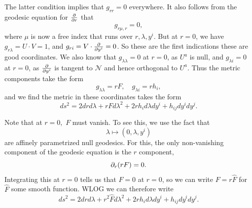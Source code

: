 The latter condition implies that $g_{rr}=0$ everywhere. It also follows from the geodesic equation for $\P{}{r}$ that
\begin{equation}
    g_{r\mu,r}=0,
\end{equation}
where $\mu$ is now a free index that runs over $r,\lambda,y^i$.
But at $r=0$, we have $g_{r\lambda}=U\cdot V = 1$, and $g_{ri}=V\cdot \P{}{y^i}=0$.
So these are the first indications these are good coordinates. We also know that $g_{\lambda\lambda}=0$ at $r=0$, as $U^a$ is null, and $g_{\lambda i}=0$ at $r=0$, as $\P{}{y^i}$ is tangent to $\mathcal{N}$ and hence orthogonal to $U^a$. Thus the metric components take the form
\begin{equation}
    g_{\lambda\lambda}= rF, \quad g_{\lambda i} = r h_i,
\end{equation}
and we find the metric in these coordinates takes the form
\begin{equation}
    ds^2 = 2drd\lambda +rF d\lambda^2 +2rh_i d\lambda dy^i + h_{ij} dy^i dy^j.
\end{equation}

Note that at $r=0,$ $F$ must vanish. To see this, we use the fact that
\begin{equation}
     \lambda\mapsto (0,\lambda,y^i)
\end{equation}
are affinely parametrized null geodesics. For this, the only non-vanishing component of the geodesic equation is the $r$ component,
\begin{equation}
    \p_r (rF)=0.
\end{equation}
Integrating this at $r=0$ tells us that $F=0$ at $r=0$, so we can write $F=r\hat F$ for $\hat F$ some smooth function. WLOG we can therefore write
\begin{equation}
    ds^2 = 2drd\lambda +r^2 \hat F d\lambda^2 +2rh_i d\lambda dy^i + h_{ij} dy^i dy^j.
\end{equation}

